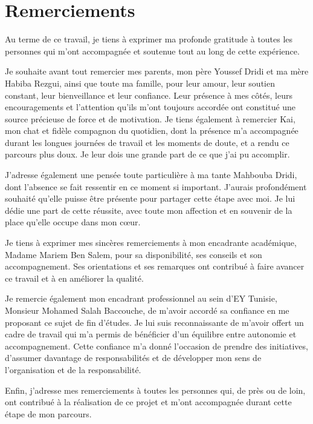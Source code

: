 \chapter*{Remerciements}

Au terme de ce travail, je tiens à exprimer ma profonde gratitude à toutes les personnes qui m'ont accompagnée et soutenue tout au long de cette expérience.

Je souhaite avant tout remercier mes parents, mon père Youssef Dridi et ma mère Habiba Rezgui, ainsi que toute ma famille, pour leur amour, leur soutien constant, leur bienveillance et leur confiance. Leur présence à mes côtés, leurs encouragements et l'attention qu'ils m'ont toujours accordée ont constitué une source précieuse de force et de motivation. Je tiens également à remercier Kai, mon chat et fidèle compagnon du quotidien, dont la présence m'a accompagnée durant les longues journées de travail et les moments de doute, et a rendu ce parcours plus doux. Je leur dois une grande part de ce que j'ai pu accomplir.

J'adresse également une pensée toute particulière à ma tante Mahbouba Dridi, dont l'absence se fait ressentir en ce moment si important. J'aurais profondément souhaité qu'elle puisse être présente pour partager cette étape avec moi. Je lui dédie une part de cette réussite, avec toute mon affection et en souvenir de la place qu'elle occupe dans mon cœur.

Je tiens à exprimer mes sincères remerciements à mon encadrante académique, Madame Mariem Ben Salem, pour sa disponibilité, ses conseils et son accompagnement. Ses orientations et ses remarques ont contribué à faire avancer ce travail et à en améliorer la qualité.

Je remercie également mon encadrant professionnel au sein d'EY Tunisie, Monsieur Mohamed Salah Baccouche, de m'avoir accordé sa confiance en me proposant ce sujet de fin d'études. Je lui suis reconnaissante de m'avoir offert un cadre de travail qui m'a permis de bénéficier d'un équilibre entre autonomie et accompagnement. Cette confiance m'a donné l'occasion de prendre des initiatives, d'assumer davantage de responsabilités et de développer mon sens de l'organisation et de la responsabilité.

Enfin, j'adresse mes remerciements à toutes les personnes qui, de près ou de loin, ont contribué à la réalisation de ce projet et m'ont accompagnée durant cette étape de mon parcours.
